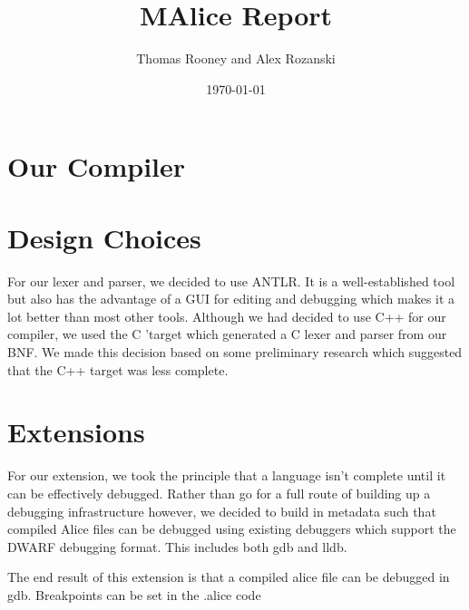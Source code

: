\documentclass[a4wide, 11pt]{article}
\begin{document}
\title{MAlice Report}

\author{Thomas Rooney and Alex Rozanski}

\date{\today}

\maketitle

\section{Our Compiler}

\section{Design Choices}

For our lexer and parser, we decided to use ANTLR. It is a well-established tool but also has the advantage of a GUI for editing and debugging which makes it a lot better than most other tools. Although we had decided to use C++ for our compiler, we used the C 'target which generated a C lexer and parser from our BNF. We made this decision based on some preliminary research which suggested that the C++ target was less complete.

\section{Extensions}

For our extension, we took the principle that a language isn't complete until it can be effectively debugged. Rather than go for a full route of building up a debugging infrastructure however, we decided to build in metadata such that compiled Alice files can be debugged using existing debuggers which support the DWARF debugging format. This includes both gdb and lldb.

The end result of this extension is that a compiled alice file can be debugged in gdb. Breakpoints can be set in the .alice code 
\end{document}
